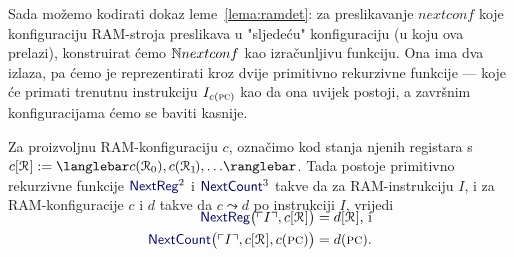 Sada možemo kodirati dokaz leme~\ref{lema:ramdet}: za preslikavanje $nextconf$ koje konfiguraciju RAM-stroja preslikava u "sljedeću" konfiguraciju (u koju ova prelazi), konstruirat ćemo ${\mathbb N} nextconf$ kao izračunljivu funkciju. Ona ima dva izlaza, pa ćemo je reprezentirati kroz dvije primitivno rekurzivne funkcije --- koje će primati trenutnu instrukciju $I_{c(\textsc{pc})}$ kao da ona uvijek postoji, a završnim konfiguracijama ćemo se baviti kasnije.

\begin{lema}[{name=[primitivna rekurzivnost prijelaza između RAM-konfiguracija]}]\label{lm:NextRegCountprn}
	Za proizvoljnu RAM-konfiguraciju $c$, označimo kod stanja njenih registara s $c[\reg{}]:=\knk{c(\reg0),c(\reg1\mspace{-2mu}),\dotsc}$. Tada postoje primitivno rekurzivne funkcije $\f{NextReg}^2$ i $\f{NextCount}^3$ takve da za RAM-instrukciju $I$, i za RAM-kon\-fi\-gu\-ra\-ci\-je $c$ i $d$ takve da $c\leadsto d$ po instrukciji $I$, vrijedi
\begin{align}
	\SwapAboveDisplaySkip
	\f{NextReg}\bigl(\kins{I},c[\reg{}]\bigr)&=d[\reg{}]\text{, i}\\
	\f{NextCount}\bigl(\kins{I},c[\reg{}],c(\textsc{pc})\bigr)&=d(\textsc{pc})\text.
\end{align}
\end{lema}
